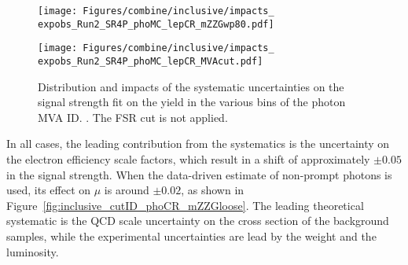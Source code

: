 \begin{figure}
  \centering
  \texttt{[image: Figures/combine/inclusive/impacts\_\\expobs\_Run2\_SR4P\_phoMC\_lepCR\_mZZGwp80.pdf]}
  \caption{}
  \label{fig:inclusive_mvaID_phoMC_mZZGwp80}
\end{figure}

\begin{figure}
  \centering
  \texttt{[image: Figures/combine/inclusive/impacts\_\\expobs\_Run2\_SR4P\_phoMC\_lepCR\_MVAcut.pdf]}
  \caption{Distribution and impacts of the systematic uncertainties on the signal strength fit
    on the yield in the various bins of the photon MVA ID.
    .
    The FSR cut is not applied.
  }
  \label{fig:inclusive_kin_phoMC_MVAcut}
\end{figure}

In all cases, the leading contribution from the systematics is the uncertainty on the electron efficiency scale factors,
which result in a shift of approximately $\pm 0.05$ in the signal strength.
When the data-driven estimate of non-prompt photons is used, its effect on $\mu$ is around $\pm 0.02$,
as shown in Figure~\ref{fig:inclusive_cutID_phoCR_mZZGloose}.
The leading theoretical systematic is the QCD scale uncertainty on the cross section of the background samples,
while the experimental uncertainties are lead by the \pileup{} weight and the luminosity.
